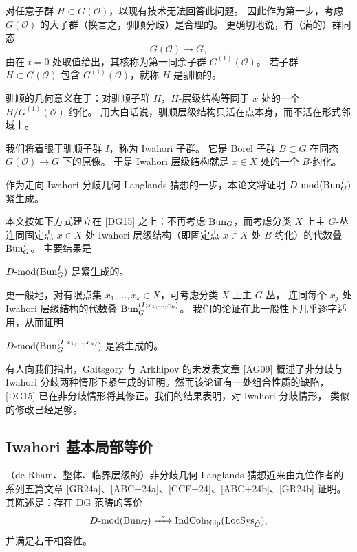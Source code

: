 对任意子群 $H\subset G(\mathcal{O})$，以现有技术无法回答此问题。
因此作为第一步，考虑 $G(\mathcal{O})$ 的大子群（换言之，驯顺分歧）是合理的。
更确切地说，有（满的）群同态
\[
G(\mathcal{O})\longrightarrow G,
\]
由在 $t=0$ 处取值给出，其核称为第一同余子群 $G^{(1)}(\mathcal{O})$。
若子群 $H\subset G(\mathcal{O})$ 包含 $G^{(1)}(\mathcal{O})$，就称 $H$ 是驯顺的。%

驯顺的几何意义在于：对驯顺子群 $H$，$H$-层级结构等同于 $x$ 处的一个
$H/G^{(1)}(\mathcal{O})$-约化。
用大白话说，驯顺层级结构只活在点本身，而不活在形式邻域上。

我们将着眼于驯顺子群 $I$，称为 Iwahori 子群。
它是 Borel 子群 $B\subset G$ 在同态 $G(\mathcal{O})\to G$ 下的原像。%
于是 Iwahori 层级结构就是 $x\in X$ 处的一个 $B$-约化。

作为走向 Iwahori 分歧几何 Langlands 猜想的一步，本论文将证明
$D\text{-}\mathrm{mod}(\mathrm{Bun}^I_G)$ 紧生成。

本文按如下方式建立在 [DG15] 之上：不再考虑 $\mathrm{Bun}_G$，而考虑分类 $X$ 上主 $G$-丛
连同固定点 $x\in X$ 处 Iwahori 层级结构（即固定点 $x\in X$ 处 $B$-约化）的代数叠 $\mathrm{Bun}^I_G$。
主要结果是
\begin{theorem}[\textup{[Nam24]}]
\label{thm:1.1.1.1}
$D\text{-}\mathrm{mod}(\mathrm{Bun}^I_G)$ 是紧生成的。
\end{theorem}

更一般地，对有限点集 $x_1,\dots,x_k\in X$，可考虑分类 $X$ 上主 $G$-丛，
连同每个 $x_j$ 处 Iwahori 层级结构的代数叠 $\mathrm{Bun}^{(I;x_1,\dots,x_k)}_G$。
我们的论证在此一般性下几乎逐字适用，从而证明
\begin{theorem}
\label{thm:1.1.1.2}
$D\text{-}\mathrm{mod}(\mathrm{Bun}^{(I;x_1,\dots,x_k)}_G)$ 是紧生成的。
\end{theorem}

有人向我们指出，Gaitsgory 与 Arkhipov 的未发表文章 [AG09] 概述了非分歧与
Iwahori 分歧两种情形下紧生成的证明。然而该论证有一处组合性质的缺陷，
[DG15] 已在非分歧情形将其修正。我们的结果表明，对 Iwahori 分歧情形，
类似的修改已经足够。

\subsection{Iwahori 基本局部等价}
\label{sec:1.1.2}

（de Rham、整体、临界层级的）非分歧几何 Langlands 猜想近来由九位作者的
系列五篇文章 [GR24a]、[ABC+24a]、[CCF+24]、[ABC+24b]、[GR24b] 证明。
其陈述是：存在 DG 范畴的等价
\[
\Dmod(\Bun_G)\xrightarrow{\ \sim\ }\IndCoh_{\Nilp}(\LocSys_{\Gd}),
\]
并满足若干相容性。

